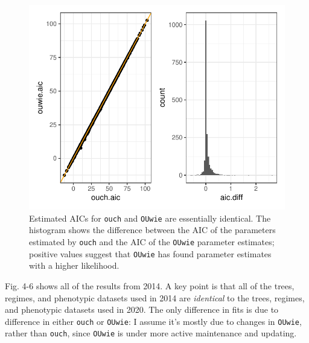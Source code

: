 \documentclass[12pt,reqno,final]{amsart}\usepackage[]{graphicx}\usepackage[]{color}
\makeatletter
\def\maxwidth{ %
  \ifdim\Gin@nat@width>\linewidth
    \linewidth
  \else
    \Gin@nat@width
  \fi
}
\newenvironment{knitrout}{}{} %
\theoremstyle{plain}
\numberwithin{equation}{part}
\makeatother
\begin{document}
\begin{knitrout}
\color{fgcolor}\begin{figure}
\includegraphics[width=\maxwidth]{figure/unnamed-chunk-3-1} \caption{Estimated AICs for \texttt{ouch} and \texttt{OUwie} are essentially identical. The histogram shows the difference between the AIC of the parameters estimated by \texttt{ouch} and the AIC of the \texttt{OUwie} parameter estimates; positive values suggest that \texttt{OUwie} has found parameter estimates with a higher likelihood.}\label{fig:unnamed-chunk-3}
\end{figure}


\end{knitrout}

\newpage

Fig. 4-6 shows all of the results from 2014.
A key point is that all of the trees, regimes, and phenotypic datasets used in 2014 are \emph{identical} to the trees, regimes, and phenotypic datasets used in 2020.
The only difference in fits is due to difference in either \texttt{ouch} or \texttt{OUwie}: I assume it's mostly due to changes in \texttt{OUwie}, rather than \texttt{ouch}, since \texttt{OUwie} is under more active maintenance and updating.
\end{document}
